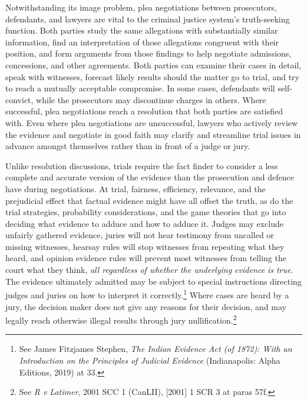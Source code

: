 Notwithstanding its image problem, plea negotiations between prosecutors, defendants, and lawyers are vital to the criminal justice system's truth-seeking function. Both parties study the same allegations with substantially similar information, find an interpretation of those allegations congruent with their position, and form arguments from those findings to help negotiate admissions, concessions, and other agreements. Both parties can examine their cases in detail, speak with witnesses, forecast likely results should the matter go to trial, and try to reach a mutually acceptable compromise. In some cases, defendants will self-convict, while the prosecutors may discontinue charges in others. Where successful, plea negotiations reach a resolution that both parties are satisfied with. Even where plea negotiations are unsuccessful, lawyers who actively review the evidence and negotiate in good faith may clarify and streamline trial issues in advance amongst themselves rather than in front of a judge or jury.

Unlike resolution discussions, trials require the fact finder to consider a less complete and accurate version of the evidence than the prosecution and defence have during negotiations. At trial, fairness, efficiency, relevance, and the prejudicial effect that factual evidence might have all offset the truth, as do the trial strategies, probability considerations, and the game theories that go into deciding what evidence to adduce and how to adduce it. Judges may exclude unfairly gathered evidence, juries will not hear testimony from uncalled or missing witnesses, hearsay rules will stop witnesses from repeating what they heard, and opinion evidence rules will prevent most witnesses from telling the court what they think, \textit{all regardless of whether the underlying evidence is true}. The evidence ultimately admitted may be subject to special instructions directing judges and juries on how to interpret it correctly.\footnote{See James Fitzjames Stephen, \textit{The Indian Evidence Act (of 1872): With an Introduction on the Principles of Judicial Evidence} (Indianapolis: Alpha Editions, 2019) at 33.} Where cases are heard by a jury, the decision maker does not give any reasons for their decision, and may legally reach otherwise illegal results through jury nullification.\footnote{See \textit{R v Latimer}, 2001 SCC 1 (CanLII), [2001] 1 SCR 3 at paras 57f.}

